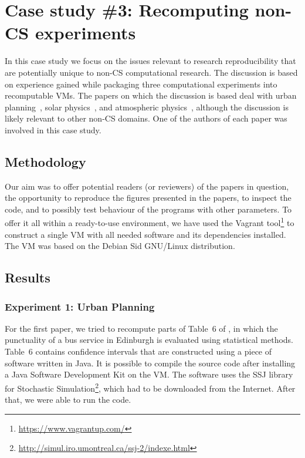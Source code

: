 \section{Case study \#3: Recomputing non-CS experiments}
\label{s:group3}

In this case study we focus on the issues relevant to research reproducibility that are potentially 
  unique to non-CS computational research.
The discussion is based on experience gained while packaging three computational experiments 
  into recomputable VMs.
The papers on which the discussion is based 
  deal with urban planning~\cite{danielpaper}, solar
  physics~\cite{bareford2010nanoflare}, and atmospheric
  physics~\cite{arabas2013libcloud},
  although the discussion is likely relevant to other non-CS domains. One of the
  authors of each paper was involved in this case study.

\subsection{Methodology}

Our aim was to offer potential readers (or reviewers) of the papers in question, 
  the opportunity to reproduce the figures presented in the papers, 
  to inspect the code, and to possibly test behaviour of the programs with other parameters.
To offer it all within a ready-to-use environment, we have used the Vagrant
tool\footnote{\url{https://www.vagrantup.com/}}
to
  construct a single VM with all needed software and its dependencies installed.
The VM was based on the Debian Sid GNU/Linux distribution.

\subsection{Results}
\subsubsection*{Experiment 1: Urban Planning}

For the first paper, we tried to recompute parts of Table~6 of
\cite{danielpaper}, in which the punctuality of a bus service in Edinburgh is
evaluated using statistical methods. Table~6 contains confidence intervals that
are constructed using a piece of software written in Java. It is possible to
compile the source code after installing a Java Software Development Kit on the
VM. The software uses the SSJ library for Stochastic
Simulation\footnote{\url{http://simul.iro.umontreal.ca/ssj-2/indexe.html}},
which had to be downloaded from the Internet. After that, we were able to run
the code.

